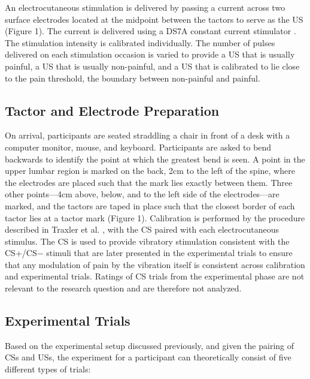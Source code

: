 \documentclass{jote-article}
\begin{document}
An electrocutaneous stimulation is delivered by passing a current across two surface electrodes located at the midpoint between the tactors to serve as the US (Figure 1). The current is delivered using a DS7A constant current stimulator \cite{bibr43}. The stimulation intensity is calibrated individually. The number of pulses delivered on each stimulation occasion is varied to provide a US that is usually painful, a US that is usually non-painful, and a US that is calibrated to lie close to the pain threshold, the boundary between non-painful and painful.

\subsection{Tactor and Electrode Preparation}

On arrival, participants are seated straddling a chair in front of a desk with a computer monitor, mouse, and keyboard. Participants are asked to bend backwards to identify the point at which the greatest bend is seen. A point in the upper lumbar region is marked on the back, 2cm to the left of the spine, where the electrodes are placed such that the mark lies exactly between them. Three other points—4cm above, below, and to the left side of the electrodes—are marked, and the tactors are taped in place such that the closest border of each tactor lies at a tactor mark (Figure 1). Calibration is performed by the procedure described in Traxler et al. \cite{bibr7}, with the CS paired with each electrocutaneous stimulus. The CS is used to provide vibratory stimulation consistent with the CS+/CS− stimuli that are later presented in the experimental trials to ensure that any modulation of pain by the vibration itself is consistent across calibration and experimental trials. Ratings of CS trials from the experimental phase are not relevant to the research question and are therefore not analyzed.

\subsection{Experimental Trials}

Based on the experimental setup discussed previously, and given the pairing of CSs and USs, the experiment for a participant can theoretically consist of five different types of trials:
\end{document}
